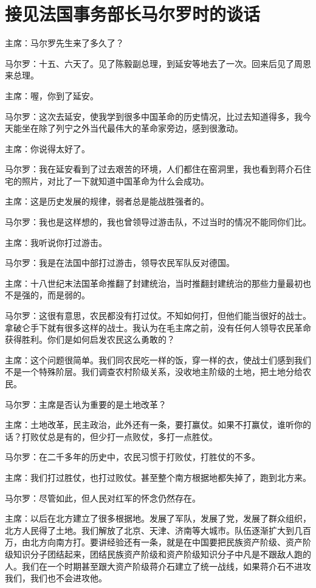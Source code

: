\section[接见法国事务部长马尔罗时的谈话（一九六五年八月三日）]{接见法国事务部长马尔罗时的谈话}


主席：马尔罗先生来了多久了？

马尔罗：十五、六天了。见了陈毅副总理，到延安等地去了一次。回来后见了周恩来总理。

主席：喔，你到了延安。

马尔罗：这次去延安，使我学到很多中国革命的历史情况，比过去知道得多，我今天能坐在除了列宁之外当代最伟大的革命家旁边，感到很激动。

主席：你说得太好了。

马尔罗：我在延安看到了过去艰苦的环境，人们都住在窑洞里，我也看到蒋介石住宅的照片，对比了一下就知道中国革命为什么会成功。

主席：这是历史发展的规律，弱者总是能战胜强者的。

马尔罗：我也是这样想的，我也曾领导过游击队，不过当时的情况不能同你们比。

主席：我听说你打过游击。

马尔罗：我是在法国中部打过游击，领导农民军队反对德国。

主席：十八世纪末法国革命推翻了封建统治，当时推翻封建统治的那些力量最初也不是强的，而是弱的。

马尔罗：这很有意思，农民都没有打过仗。不知如何打，但他们能当很好的战士。拿破仑手下就有很多这样的战士。我认为在毛主席之前，没有任何人领导农民革命获得胜利。你们是如何启发农民这么勇敢的？

主席：这个问题很简单。我们同农民吃一样的饭，穿一样的衣，使战士们感到我们不是一个特殊阶层。我们调查农村阶级关系，没收地主阶级的土地，把土地分给农民。

马尔罗：主席是否认为重要的是土地改革？

主席：土地改革，民主政治，此外还有一条，要打赢仗。如果不打赢仗，谁听你的话？打败仗总是有的，但少打一点败仗，多打一点胜仗。

马尔罗：在二千多年的历史中，农民习惯于打败仗，打胜仗的不多。

主席：我们打过胜仗，也打过败仗。甚至整个南方根据地都失掉了，跑到北方来。

马尔罗：尽管如此，但人民对红军的怀念仍然存在。

主席：以后在北方建立了很多根据地。发展了军队，发展了党，发展了群众组织，北方人民得了土地。我们解放了北京、天津、济南等大城市。队伍逐渐扩大到几百万，由北方向南方打。要讲经验还有一条，就是在中国要把民族资产阶级、资产阶级知识分子团结起来，团结民族资产阶级和资产阶级知识分子中凡是不跟敌人跑的人。我们在一个时期甚至跟大资产阶级蒋介石建立了统一战线，如果蒋介石不进攻我们，我们也不会进攻他。

